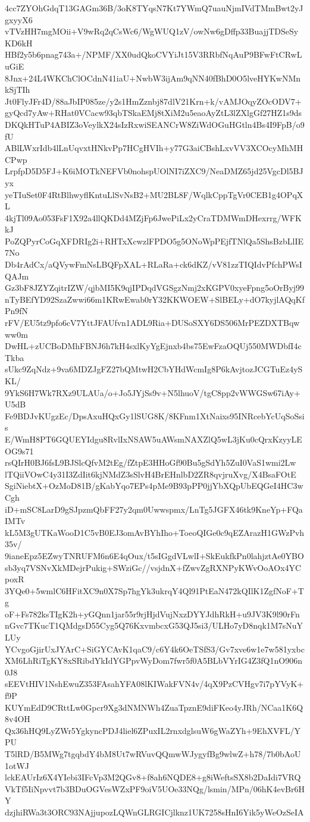 4cc7ZYOhGdqT13GAGm36B/3oK8TYqsN7Kt7YWmQ7uauNjmIVdTMmBwt2yJgxyyX6
vTVzHH7mgMOii+V9wRq2qCsWc6/WgWUQ1zV/owNw6gDffp33BuajjTDSeSyKD6kH
HBf2y5b6pnag743a+/NPMF/XX0udQkoCVYiJt15V3RRbfNqAuP9BFwFtCRwLuGiE
8Jnx+24L4WKChClOCdnN41iaU+NwbW3ijAm9qNN40fBhD0O5lveHYKwNMnkSjTIh
Jt0FlyJFr4D/88aJbIP085ze/y2s1HmZznbj87dlV21Krn+k/vAMJOqyZOcODV7+
gyQcd7yAw+RHat0VCacw93qbTSkaEMj8tXiM2u5eaoAyZtL3lZXlgGf27HZ1s9ds
DKQkHTuP4ABIZ3oVeylkX24sIzRxwiSEANCrW8ZiWdOGuHGtln4Bs4I9FpB/o9fU
ABlLWxrIdb4lLnUqvxtHNkvPp7HCgHVIh+y77G3aiCBshLxvVV3XCOcyMhMHCPwp
LrpfpD5D5FJ+K6iMOTkNEFVb0nohspUOlNI7iZXC9/NeaDMZ65jd25VgcDl5BJyx
yeTIuSet0F4RtBlhwyflKntuLlSvNsB2+MU2BL8F/WqlkCppTgVr0CEB1g4OPqXL
4kjTl09Ao053FsF1X92a4llQKDd4MZjFp6JwePiLx2yCraTDMWmDHexrrg/WFKkJ
PoZQPyrCoGqXFDRIg2i+RHTxXcwzlFPDO5g5ONoWpPEjfTNlQa5ShsBzbLlIE7No
Db4rAdCx/aQVywFmNsLBQFpXAL+RLaRa+ck6dKZ/vV81zzTIQIdvPfchPWsIQAJm
Gz3bF8JZYZqitrIZW/qjbMI5K9qjIPDqdVGSgzNmj2xKGPV0xyeFpng5oOrByj99
nTyBEfYD92SzaZwwi66m1KRwEwab0rY32KKWOEW+SlBELy+dO7kyjlAQqKfPn9fN
rFV/EU5tz9pfo6cV7YttJFAUfvn1ADL9Ria+DUSoSXY6DS506MrPEZDXTBqwww0m
DwHL+zUCBoDMhFBNJ6h7kH4sxlKyYgEjnxb4bs75EwFzaOQUj550MWDbfI4cTkba
sUkc9ZqNdz+9va6MDZJgFZ27bQMtwH2CbYHdWcmIg8P6kAvjtozJCGTuEz4ySKL/
9YkS6H7Wk7RXz9ULAUa/o+Jo5JYjSs9v+N5lhuoV/tgC8pp2vWWGSw67iAy+U5dB
Fe9BDJvKUgzEc/DpsAxuHQxGy1lSUG8K/8KFnm1XtNaixs95INRcebYcUqSoSsis
E/WmH8PT6GQUEYIdgu8RvlIxNSAW5uAWsmNAXZlQ5wL3jKu0cQrxKzyyLEOG9s71
rsQIrH0BJ6fsL9BJSlcQfvM2tEg/fZtpE3HHoGf90Bu5gSdYh5ZuI0VaS1wmi2Lw
lTQiiVOwC4y31I3ZdIit6kjNMdZ3sSlvH4BrEHnlbD2ZR8qvjruXvg/X4BsaFOtE
SgiNiebtX+OzMoD81B/gKabYqo7EPs4pMe9B93pPP0jjYbXQpUbEQGeI4HC3wCgh
iD+mSC8LarD9gSJpzmQbFF27y2qm0Uwwspmx/LnTg5JGFX46tk9KneYp+FQaIMTv
kL5M3gUTKaWooD1C5vB0EJ3omAvBYhIho+ToeoQIGe0c9qEZArazH1GWzPvh35v/
9ianeEpz5EZwyTNRUFM6n6E4qOux/t5sIGgdVLwlI+SkEukfkPn0lahjztAe0YBO
sb3yq7VSNvXkMDejrPukig+SWziGc//vsjdnX+fZwvZgRXNPyKWvOoAOx4YCpoxR
3YQe0+5wmlC6HFitXC9n0X7Sp7hgYk3ukrqY4Ql91PtEaN472kQIlK1ZgfNoF+Tg
oF+Fs782ksTIgK2h+yGQnn1jar55r9rjHjdVujNxzDYYJdhRkH+u9JV3K9l90rFn
nGvc7TKucT1QMdgsD55Cyg5Q76KxvmbcxG53QJ5si3/ULHo7yD8nqk1M7sNuYLUy
YCvgoGjirUxJYArC+SiGYCAvK1qaC9/c6Y4k6OeTSfS3/Gv7xve6w1e7w581yxbc
XM6LhRiTgKY8xSRibdYkIdYGPpvWyDom7fwr5f0A5BLbVYrIG4Z3fQ1nO906n0J8
sEEVtHIV1NshEwuZ353FAsahYFA08lKIWakFVN4v/4qX9PzCVHgv7i7pYVyK+f9P
KUYmEdD9CRttLw0Gpcr9Xg3dNMNWh4ZuaTpznE9diFKeo4yJRh/NCaa1K6Q8v4OH
Qx36hHQ9LyZWr5YgkyncPDJ4liel6ZPuxIL2rnxdglsuW6gWaZYh+9EhXVFL/YPU
T5lRD/B5MWg7tgqbdY4bM8Ut7wRVuvQQmwWJygyfBg9wlwZ+h78/7b0bAoU1otWJ
lckEAUrIz6X4YIebi3IFcVp3M2QGv8+f8ah6NQDE8+g8iWeftsSX8b2DaIdi7VRQ
VkTf5IiNpvvt7b3BDuOGVesWZxPF9oiV5UOe33NQg/lsmin/MPn/06hK4evBr6HY
dzjhiRWa3t3ORC93NAjjupozLQWnGLRGICjlknz1UK7258sHnI6Yik5yWeOzSeIA
